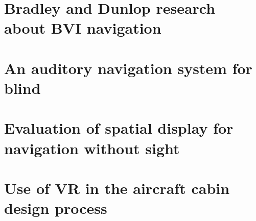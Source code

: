 \section{Bradley and Dunlop research about BVI navigation}
\label{sec:bradley_dunlop}


\section{An auditory navigation system for blind}
\label{sec:auditory_navigation}


\section{Evaluation of spatial display for navigation without sight}
\label{sec:evaluation_spatial_display}


\section{Use of VR in the aircraft cabin design process}
\label{sec:vr_cabin}

